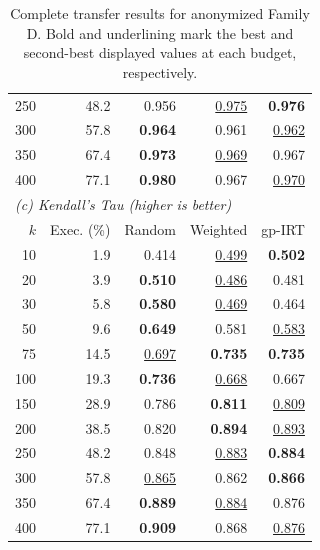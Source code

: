 \begin{table}[t]
\begin{tabular}{rrrrr}
    250 & 48.2 & 0.956 & \underline{0.975} & \textbf{0.976} \\
    300 & 57.8 & \textbf{0.964} & 0.961 & \underline{0.962} \\
    350 & 67.4 & \textbf{0.973} & \underline{0.969} & 0.967 \\
    400 & 77.1 & \textbf{0.980} & 0.967 & \underline{0.970} \\
    \midrule
    \multicolumn{5}{l}{\textit{(c) Kendall's Tau (higher is better)}} \\
    $k$ & Exec. (\%) & Random & Weighted & gp-IRT \\
    \midrule
    10 & 1.9 & 0.414 & \underline{0.499} & \textbf{0.502} \\
    20 & 3.9 & \textbf{0.510} & \underline{0.486} & 0.481 \\
    30 & 5.8 & \textbf{0.580} & \underline{0.469} & 0.464 \\
    50 & 9.6 & \textbf{0.649} & 0.581 & \underline{0.583} \\
    75 & 14.5 & \underline{0.697} & \textbf{0.735} & \textbf{0.735} \\
    100 & 19.3 & \textbf{0.736} & \underline{0.668} & 0.667 \\
    150 & 28.9 & 0.786 & \textbf{0.811} & \underline{0.809} \\
    200 & 38.5 & 0.820 & \textbf{0.894} & \underline{0.893} \\
    250 & 48.2 & 0.848 & \underline{0.883} & \textbf{0.884} \\
    300 & 57.8 & \underline{0.865} & 0.862 & \textbf{0.866} \\
    350 & 67.4 & \textbf{0.889} & \underline{0.884} & 0.876 \\
    400 & 77.1 & \textbf{0.909} & 0.868 & \underline{0.876} \\
    \bottomrule
  \end{tabular}
  \caption{Complete transfer results for anonymized Family D. Bold and underlining mark the best and second-best displayed values at each budget, respectively.}
  \label{tab:transfer-family-d-complete}
\end{table}

